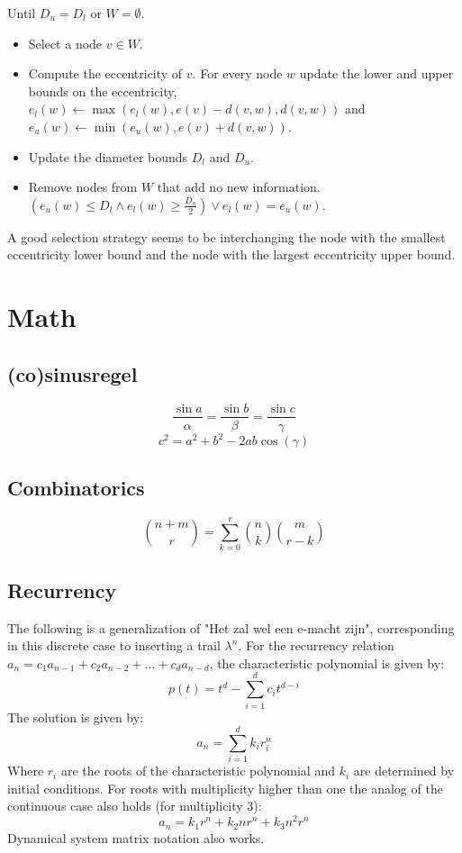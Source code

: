 \documentclass[10pt,hidelinks]{article}
\begin{document}
Until $D_u = D_l$ or $W = \emptyset$.
\begin{itemize}
	\item Select a node $v \in W$.
	\item Compute the eccentricity of $v$. For every node $w$ update the lower
		and upper bounds on the eccentricity, $e_l(w) \leftarrow \max(e_l(w),
		e(v) - d(v, w), d(v, w))$ and $e_u(w) \leftarrow \min(e_u(w), e(v)
		+ d(v, w))$.
	\item Update the diameter bounds $D_l$ and $D_u$.
	\item Remove nodes from $W$ that add no new information.
		$(e_u(w) \leq D_l \land e_l(w) \geq \frac{D_u}{2}) \lor e_l(w) =
		e_u(w)$.
\end{itemize}

A good selection strategy seems to be interchanging the node with the smallest
eccentricity lower bound and the node with the largest eccentricity upper bound.

\section{Math}


\subsection{(co)sinusregel}

\[\frac{\sin a}{\alpha} = \frac{\sin b}{\beta} =\frac{\sin c}{\gamma}\]
\[c^2=a^2+b^2-2ab\cos(\gamma)\]

\subsection{Combinatorics}

\[\binom{n+m}{r} = \sum_{k=0}^r \binom{n}{k} \binom{m}{r-k}\]

\subsection{Recurrency}
The following is a generalization of "Het zal wel een e-macht zijn", corresponding in this discrete case to inserting a trail $\lambda^n$.
For the recurrency relation $a_n = c_1a_{n-1} + c_2a_{n-2} + \dots + c_da_{n-d}$, the characteristic polynomial is given by:
\[p(t) = t^d - \sum_{i=1}^d c_it^{d-i}\]
The solution is given by:
\[a_n = \sum_{i=1}^d k_ir_i^n\]
Where $r_i$ are the roots of the characteristic polynomial and $k_i$ are determined by initial conditions. For roots with multiplicity higher than one the analog of the continuous case also holds (for multiplicity 3):
\[a_n = k_1r^n+k_2nr^n+k_3n^2r^n\]
Dynamical system matrix notation also works.
\end{document}
